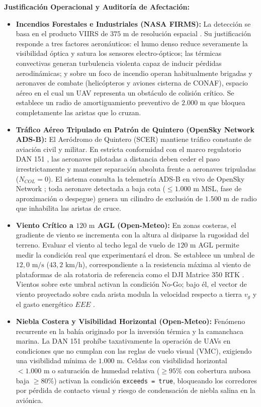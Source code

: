 \documentclass[letterpaper,12pt]{article}
\begin{document}
\noindent \textbf{Justificación Operacional y Auditoría de Afectación:}
\begin{itemize}
    \item \textbf{Incendios Forestales e Industriales (NASA FIRMS):} La detección se basa en el producto VIIRS de $375\text{ m}$ de resolución espacial \cite{schroeder}. Su justificación responde a tres factores aeronáuticos: el humo denso reduce severamente la visibilidad óptica y satura los sensores electro-ópticos; las térmicas convectivas generan turbulencia violenta capaz de inducir pérdidas aerodinámicas; y sobre un foco de incendio operan habitualmente brigadas y aeronaves de combate (helicópteros y aviones cisterna de CONAF), espacio aéreo en el cual un UAV representa un obstáculo de colisión crítico. Se establece un radio de amortiguamiento preventivo de $2.000\text{ m}$ que bloquea completamente las aristas que lo cruzan.
    \item \textbf{Tráfico Aéreo Tripulado en Patrón de Quintero (OpenSky Network ADS-B):} El Aeródromo de Quintero (SCER) mantiene tráfico constante de aviación civil y militar. En estricta conformidad con el marco regulatorio DAN 151 \cite{dan151}, las aeronaves pilotadas a distancia deben ceder el paso irrestrictamente y mantener separación absoluta frente a aeronaves tripuladas ($N_{COL} = 0$). El sistema consulta la telemetría ADS-B en vivo de OpenSky Network \cite{opensky}; toda aeronave detectada a baja cota ($\le 1.000\text{ m}$ MSL, fase de aproximación o despegue) genera un cilindro de exclusión de $1.500\text{ m}$ de radio que inhabilita las aristas de cruce.
    \item \textbf{Viento Crítico a $120\text{ m}$ AGL (Open-Meteo):} En zonas costeras, el gradiente de viento se incrementa con la altura al disiparse la rugosidad del terreno. Evaluar el viento al techo legal de vuelo de $120\text{ m}$ AGL permite medir la condición real que experimentará el dron. Se establece un umbral de $12{,}0\text{ m/s}$ ($43{,}2\text{ km/h}$), correspondiente a la resistencia máxima al viento de plataformas de ala rotatoria de referencia como el DJI Matrice 350 RTK \cite{dji}. Vientos sobre este umbral activan la condición No-Go; bajo él, el vector de viento proyectado sobre cada arista modula la velocidad respecto a tierra $v_g$ y el gasto energético $EEE$ \cite{kosior}.
    \item \textbf{Niebla Costera y Visibilidad Horizontal (Open-Meteo):} Fenómeno recurrente en la bahía originado por la inversión térmica y la camanchaca marina. La DAN 151 prohíbe taxativamente la operación de UAVs en condiciones que no cumplan con las reglas de vuelo visual (VMC), exigiendo una visibilidad mínima de $1.000\text{ m}$. Celdas con visibilidad horizontal $< 1.000\text{ m}$ o saturación de humedad relativa ($\ge 95$\% con cobertura nubosa baja $\ge 80$\%) activan la condición \texttt{exceeds = true}, bloqueando los corredores por pérdida de contacto visual y riesgo de condensación de niebla salina en la aviónica.

\end{itemize}
\end{document}
